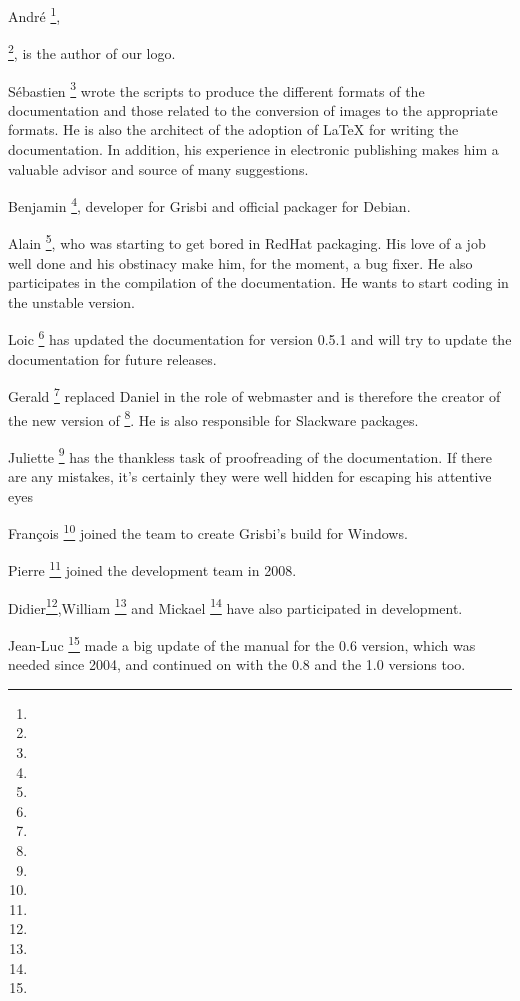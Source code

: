 {André }\footnote{\urlAndrePascualEmail{}},

\footnote{\urlLinuxGraphic{}}, is the author of our logo.

{Sébastien }\footnote{\urlSebastienBlondeelEmail{}} wrote the scripts to produce the different formats of the documentation and those related to the conversion of images to the appropriate formats. He is also the architect of the adoption of \gls{LaTeX} for writing the documentation. In addition, his experience in electronic publishing makes him a valuable advisor and source of many suggestions.

{Benjamin }\footnote{\urlBenjaminDrieuEmail{}}, developer for Grisbi and official packager for \gls{Debian}.

{Alain }\footnote{\urlDionysosEmail{}}, who was starting to get bored in \gls{RedHat} packaging. His love of a job well done and his obstinacy make him, for the moment, a bug fixer. He also participates in the compilation of the documentation. He wants to start coding in the unstable version.

{Loic }\footnote{\urlLoicBreillouxEmail{}} has updated the documentation for version 0.5.1 and will try to update the documentation for future releases.

{Gerald }\footnote{\urlGeraldNielEmail{}} replaced {Daniel } in the role of webmaster and is therefore the creator of the new version of \footnote{\urlGrisbi{}}. He is also responsible for \gls{Slackware} packages.

{Juliette }\footnote{\urlJulietteEmail{}} has the thankless task of proofreading of the documentation. If there are any mistakes, it's certainly they were well hidden for escaping his attentive eyes

{François }\footnote{\urlFrancoisTerrotEmail{}} joined the team to create Grisbi's \gls{build} for Windows.

{Pierre }\footnote{\urlPierreBiavaEmail{}} joined the development team in 2008.

{Didier}\footnote{\urlDidierChevalierEmail{}},{William }\footnote{\urlWilliamOllivierEmail{}} and {Mickael }\footnote{\urlMickaelRemarsEmail{}} have also participated in development.

{Jean-Luc }\footnote{\urlJeanLucDuflotEmail{}} made a big update of the manual for the 0.6 version, which was needed since 2004, and continued on with the 0.8 and the 1.0 versions too.

